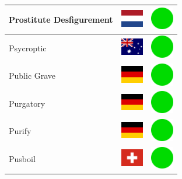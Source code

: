 \documentclass[12pt, a4paper, twoside]{report}
\begin{document}
\begin{center}
\begin{longtable}{|p{5cm}|p{2cm}|p{2cm}|}
Prostitute Desfigurement & \includegraphics[width=1cm]{4x3/nl} & \includegraphics[width=1cm]{likes/y} \\ \hline
Psycroptic & \includegraphics[width=1cm]{4x3/au} & \includegraphics[width=1cm]{likes/y} \\ \hline
Public Grave & \includegraphics[width=1cm]{4x3/de} & \includegraphics[width=1cm]{likes/y} \\ \hline
Purgatory & \includegraphics[width=1cm]{4x3/de} & \includegraphics[width=1cm]{likes/y} \\ \hline
Purify & \includegraphics[width=1cm]{4x3/de} & \includegraphics[width=1cm]{likes/y} \\ \hline
Pusboil & \includegraphics[width=1cm]{4x3/ch} & \includegraphics[width=1cm]{likes/y} \\ \hline

\end{longtable}
\end{center}
\end{document}
